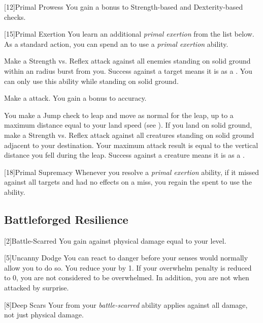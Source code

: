         [12]{Primal Prowess}
        You gain a  bonus to Strength-based and Dexterity-based checks.

        [15]{Primal Exertion}
        You learn an additional \textit{primal exertion} from the list below.
        As a standard action, you can spend an  to use a \textit{primal exertion} ability.
        {
             Make a Strength vs. Reflex attack against all enemies standing on solid ground within an \areamed radius burst from you.
            Success against a target means it is \stunned as a .
            You can only use this ability while standing on solid ground.

             Make a  attack.
            You gain a  bonus to accuracy.

             You make a Jump check to leap and move as normal for the leap, up to a maximum distance equal to your land speed (see ).
            If you land on solid ground, make a Strength vs. Reflex attack against all creatures standing on solid ground adjacent to your destination.
            Your maximum attack result is equal to the vertical distance you fell during the leap.
            Success against a creature means it is \stunned as a .
        }

        [18]{Primal Supremacy}
        Whenever you resolve a \textit{primal exertion} ability, if it missed against all targets and had no effects on a miss, you regain the  spent to use the ability.

    \subsection{Battleforged Resilience}
        [2]{Battle-Scarred} You gain  against physical damage equal to your level.

        [5]{Uncanny Dodge} You can react to danger before your senses would normally allow you to do so.
        You reduce your  by 1.
        If your overwhelm penalty is reduced to 0, you are not considered to be overwhelmed.
        In addition, you are not \unaware when attacked by surprise.

        [8]{Deep Scars} Your  from your \textit{battle-scarred} ability applies against all damage, not just physical damage.

